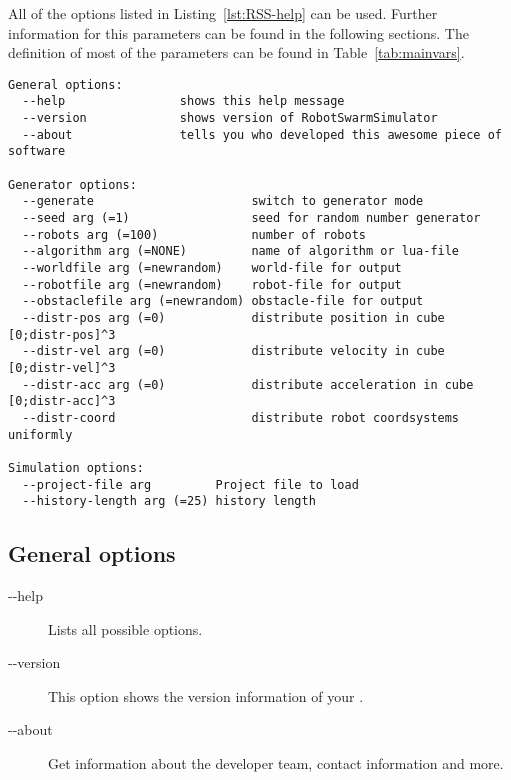 \documentclass[a4paper,halfparskip,11pt,twoside]{scrartcl}
\begin{document}
All of the options listed in Listing~\ref{lst:RSS-help} can be used. Further information for this parameters can be found in the following sections. The definition of most of the parameters can be found in Table~\ref{tab:mainvars}.

\begin{lstlisting}[caption={RSS Helpline},label=lst:RSS-help]
General options:
  --help                shows this help message
  --version             shows version of RobotSwarmSimulator
  --about               tells you who developed this awesome piece of software

Generator options:
  --generate                      switch to generator mode
  --seed arg (=1)                 seed for random number generator
  --robots arg (=100)             number of robots
  --algorithm arg (=NONE)         name of algorithm or lua-file
  --worldfile arg (=newrandom)    world-file for output
  --robotfile arg (=newrandom)    robot-file for output
  --obstaclefile arg (=newrandom) obstacle-file for output
  --distr-pos arg (=0)            distribute position in cube [0;distr-pos]^3
  --distr-vel arg (=0)            distribute velocity in cube [0;distr-vel]^3
  --distr-acc arg (=0)            distribute acceleration in cube [0;distr-acc]^3
  --distr-coord                   distribute robot coordsystems uniformly

Simulation options:
  --project-file arg         Project file to load
  --history-length arg (=25) history length
\end{lstlisting}


\subsection{General options}
\begin{description}
	\item [-{}-help] Lists all possible options.
	\item [-{}-version] This option shows the version information of your \RSS.
	\item [-{}-about] Get information about the developer team, contact information and more.
\end{description}
\end{document}
